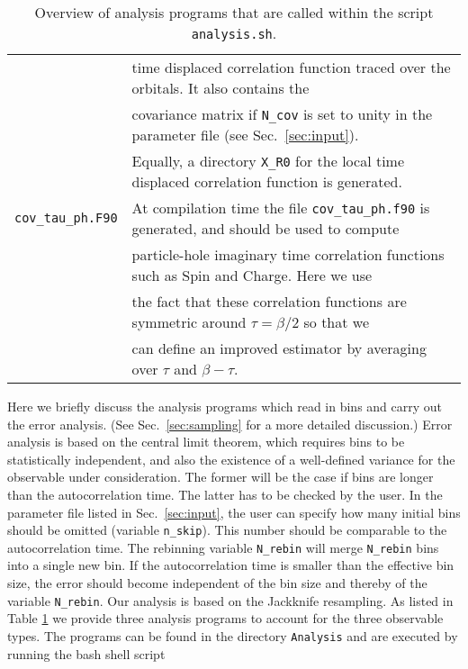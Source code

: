 \begin{table}[h]
\begin{tabular}{@{} l l @{}}
                           & time displaced correlation function traced over the  orbitals.  It also contains the  \\
                           & covariance matrix if \texttt{N\_cov} is set to unity in the parameter file  (see Sec.~\ref{sec:input}). \\
                           & Equally, a directory  \texttt{X\_R0}  for the local  time displaced  correlation function is generated.  \\                         
   \texttt{cov\_tau\_ph.F90}            & At compilation time  the file \texttt{cov\_tau\_ph.f90} is generated, and  should be used to compute \\ 
                           & particle-hole  imaginary time correlation functions such as Spin and Charge.   Here we use  \\
                           &  the fact that these  correlation functions  are symmetric around $\tau = \beta/2$ so that we \\
                           &  can define an improved estimator by averaging over $\tau$ and $\beta - \tau$.  
                                  \\\bottomrule
   \end{tabular}
   \caption{ Overview of analysis programs that are called within the script \texttt{analysis.sh}. \label{table:analysis_programs}}
\end{table}
%
Here we briefly   discuss the analysis programs which read in bins and carry out the error analysis. (See Sec.~\ref{sec:sampling}  for a more detailed discussion.)
Error analysis   is based  on the central limit theorem,  which requires bins to be statistically independent, and also the existence of a well-defined variance  for the observable under consideration. 
The former will be the case if bins are  longer than the autocorrelation time.  The latter has to be checked by the user.  In the parameter file listed in Sec.~\ref{sec:input}, the user  can specify how many initial bins should be omitted (variable \texttt{n\_skip}). 
This  number should be comparable to the autocorrelation time.     
The  rebinning  variable \texttt{N\_rebin} will merge \texttt{N\_rebin}  bins into a single new bin. 
If the autocorrelation time  is smaller than the effective bin size, the error should become independent of the bin size and thereby of the variable \texttt{N\_rebin}.  
Our analysis is based on the Jackknife resampling\cite{efron1981}.
As listed in Table  \ref{table:analysis_programs}  we provide three analysis programs to account for the three observable types. The programs can be found in the directory \texttt{Analysis}  and   are executed by running the  bash shell script 
